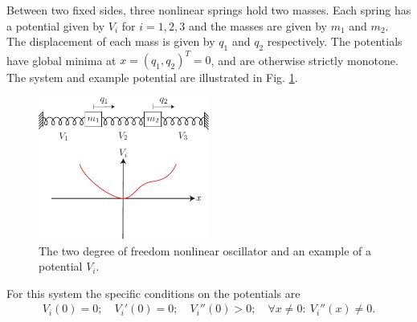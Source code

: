 \begin{ex}
	Between two fixed sides, three nonlinear springs hold two masses. Each spring has a potential given by $V_{i}$ for $i=1,2,3$ and the masses are given by $m_1$ and $m_2$. The displacement of each mass is given by $q_1$ and $q_2$ respectively. The potentials have global minima at $x=(q_1, q_2)^T=0$, and are otherwise strictly monotone. The system and example potential are illustrated in Fig. \ref{fig:2dof_oscillator_hamiltonian}.
	\begin{figure}[h!]
		\centering
		\includegraphics[width=0.5\textwidth]{figures/ch8/4_2dof_oscillator_hamiltonian.pdf}
		\caption{The two degree of freedom nonlinear oscillator and an example of a potential $V_i$.}
		\label{fig:2dof_oscillator_hamiltonian}
	\end{figure}
	
	For this system the specific conditions on the potentials are
	\begin{align}
		V_{i}(0) =0;\quad V_{i}'(0)=0;\quad V_{i}''(0)>0;\quad \forall x\neq 0:\ V_{i}''(x)\neq 0 . \label{eq8:2dof_conditions}
	\end{align}


\end{ex}
